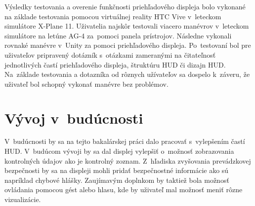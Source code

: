 Výsledky testovania a overenie funkčnosti priehľadového displeja bolo vykonané na základe testovania pomocou virtuálnej reality HTC Vive v~leteckom simulátore X-Plane 11. Uživatelia najskôr testovali viacero manévrov v~leteckom simulátore na letúne AG-4 za~pomoci panela prístrojov. Následne vykonali rovnaké manévre v~Unity za pomoci priehľadového displeja. Po~testovaní bol pre uživateľov pripravený dotázník s~otázkami zameranými na čitateľnosť jednotlivých častí priehľadového displeja, štruktúru HUD či dizajn HUD. Na~základe testovania a dotazníka od rôznych užívateľov sa dospelo k~záveru, že uživateľ bol schopný vykonať manévre bez problémov. 

\section{Vývoj v~budúcnosti}
V~budúcnosti by sa na tejto bakalárskej práci dalo pracovať s~vylepšením častí HUD. V~budúcom vývoji by sa dal displej vylepšiť o~možnosť zobrazovania kontrolných údajov ako je kontrolný zoznam. Z~hľadiska zvyšovania prevádzkovej bezpečnosti by sa na displeji mohli pridať bezpečnostné informácie ako sú napríklad chybové hlášky. Zaujímavým doplnkom by taktiež bola možnosť ovládania pomocou gést alebo hlasu, kde by uživateľ mal možnosť meniť rôzne vizualizácie.
